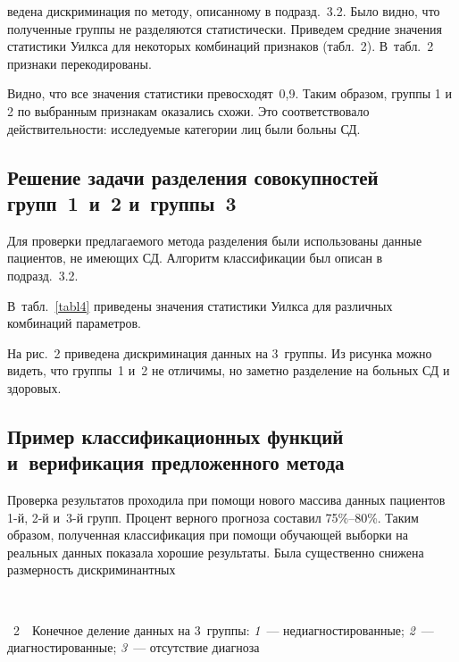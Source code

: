 \begin{multicols}{2}
\vspace*{9pt}


\addtocounter{table}{1}  

        

\noindent
ведена дискриминация по методу, описанному в подразд.~3.2. 
Было видно, что полученные группы не разделяются статистически.
Приведем средние значения статистики Уилкса для некоторых комбинаций
признаков (табл.~2). В~табл.~2 признаки перекодированы.



Видно, что все значения статистики превосходят~0,9. Таким образом,
группы 1 и 2 по выбранным признакам оказались схожи. Это
соответствовало действительности: исследуемые категории лиц были
больны СД.

\subsection{Решение задачи разделения совокупностей групп~1~и~2 и~группы~3 }

Для проверки предлагаемого метода разделения были использованы
данные пациентов, не име\-ющих СД. Алгоритм классификации был описан в
подразд.~3.2. 

В~табл.~\ref{tabl4} приведены значения статистики Уилкса
для различных комбинаций па\-ра\-метров.


На рис.~2 приведена дискриминация данных на 3~группы. Из
рисунка можно видеть, что группы~1 и~2 не отличимы, 
но заметно разделение на больных СД и здоровых.

\subsection{Пример классификационных функций и~верификация предложенного метода}

Проверка результатов проходила при помощи нового массива данных
пациентов 1-й, 2-й и~3-й групп. Процент верного прогноза составил 75\%--80\%. 
Таким образом, полученная классификация при помощи обучающей
выборки на реальных данных показала хорошие результаты. Была
существенно снижена размерность дискриминантных\linebreak\vspace*{-12pt}
\begin{center}  %
\mbox{%
 \epsfxsize=65.024mm
 }
  \end{center}
 \vspace*{3pt}
{{\figurename~2}\ \ \small{Конечное деление данных на 3~группы:
   \textit{1}~--- недиагностированные;
   \textit{2}~--- диагностированные;
   \textit{3}~--- отсутствие диагноза}}



\end{multicols}
